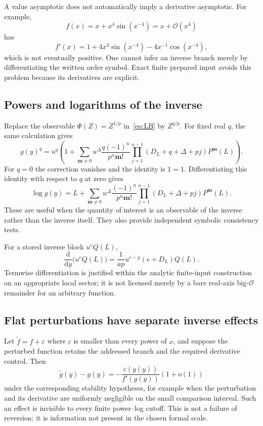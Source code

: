 \documentclass[11pt,a4paper]{article}
\numberwithin{equation}{section}
\theoremstyle{definition}
\theoremstyle{remark}
\newcommand{\dd}{\mathrm d}
\newcommand{\OO}{\mathcal O}
\begin{document}
A value asymptotic does not automatically imply a derivative asymptotic.
For example,
\[
 f(x)=x+x^4\sin(x^{-4})=x+\OO(x^4)
\]
has
\[
 f'(x)=1+4x^3\sin(x^{-4})-4x^{-1}\cos(x^{-4}),
\]
which is not eventually positive. One cannot infer an inverse branch
merely by differentiating the written order symbol. Exact finite prepared
input avoids this problem because its derivatives are explicit.

\subsection{Powers and logarithms of the inverse}

Replace the observable $\Phi(Z)=Z^{1/p}$ in~\eqref{eq:LB} by $Z^{q/p}$.
For fixed real $q$, the same calculation gives
\begin{equation}\label{eq:observable}
 g(y)^q=u^q\left(1+\sum_{\boldsymbol m\ne0}u^\Delta
 \frac{q(-1)^n}{p^n\boldsymbol m!}
 \prod_{j=1}^{n-1}(D_L+q+\Delta+pj)P^{\boldsymbol m}(L)\right).
\end{equation}
For $q=0$ the correction vanishes and the identity is $1=1$.
Differentiating this identity with respect to $q$ at zero gives
\begin{equation}\label{eq:loginverse}
 \log g(y)=L+\sum_{\boldsymbol m\ne0}u^\Delta
 \frac{(-1)^n}{p^n\boldsymbol m!}
 \prod_{j=1}^{n-1}(D_L+\Delta+pj)P^{\boldsymbol m}(L).
\end{equation}
These are useful when the quantity of interest is an observable of the
inverse rather than the inverse itself. They also provide independent
symbolic consistency tests.

For a stored inverse block $u^eQ(L)$,
\[
 \frac{\dd}{\dd y}\bigl(u^eQ(L)\bigr)
 =\frac1{ap}u^{e-p}(e+D_L)Q(L).
\]
Termwise differentiation is justified within the analytic finite-input
construction on an appropriate local sector; it is not licensed merely by
a bare real-axis big-$\OO$ remainder for an arbitrary function.

\subsection{Flat perturbations have separate inverse effects}

Let $\widetilde f=f+\varepsilon$ where $\varepsilon$ is smaller than every
power of $x$, and suppose the perturbed function retains the addressed
branch and the required derivative control. Then
\[
 \widetilde g(y)-g(y)
 =-\frac{\varepsilon(g(y))}{f'(g(y))}(1+o(1))
\]
under the corresponding stability hypotheses, for example when the
perturbation and its derivative are uniformly negligible on the small
comparison interval. Such an effect is invisible to every finite
power--log cutoff. This is not a failure of reversion; it is information
not present in the chosen formal scale.
\end{document}
